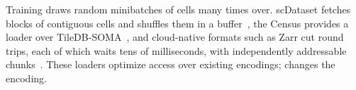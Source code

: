 Training draws random minibatches of cells many times over. scDataset fetches blocks of contiguous
cells and shuffles them in a buffer~\cite{dascenzo2025scdataset}, the Census provides a loader over
TileDB-SOMA~\cite{tiledbsomaml}, and cloud-native formats such as Zarr cut round trips, each of which waits tens of
milliseconds, with independently addressable chunks~\cite{abernathey2021cloud,durner2023exploiting}. These loaders
optimize access over existing encodings; \sone{} changes the encoding.
